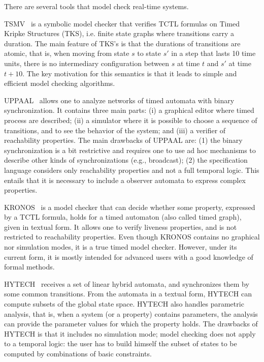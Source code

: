 \documentclass{llncs}
\begin{document}
There are several tools that model check real-time systems.

TSMV~\cite{Markey03} is a symbolic model checker that verifies TCTL formulas on Timed Kripke Structures (TKS), 
i.e. finite state graphs where transitions carry a duration. 
The main feature of TKS's is that the durations of transitions are atomic, that is, 
when moving from state $s$ to state $s{'}$ in a step that lasts 10 time units, 
there is no intermediary configuration between $s$ at time $t$ and $s{'}$ at time $t+10$. 
The key motivation for this semantics is that it leads to simple and efficient model checking algorithms.

UPPAAL~\cite{upaal97} allows one to analyze networks of timed automata with binary synchronization. 
It contains three main parts: (i) a graphical editor where timed process are described; 
(ii) a simulator where it is possible to choose a sequence of transitions, 
and to see the behavior of the system; and
(iii) a verifier of reachability properties. 
The main drawbacks of UPPAAL are: (1) the binary synchronization 
is a bit restrictive and requires one to use ad hoc mechanisms 
to describe other kinds of synchronizations (e.g., broadcast); 
(2) the specification language considers only reachability properties and not a full temporal logic.
This entails that it is necessary to include a observer automata to express complex properties. 

KRONOS~\cite{kronos97} is a model checker that can decide whether some property, 
expressed by a TCTL formula, holds for a timed automaton 
(also called timed graph), given in textual form. 
It allows one to verify liveness properties, 
and is not restricted to reachability properties. 
Even though KRONOS contains no graphical nor simulation modes,
it is a true timed model checker. 
However, under its current form, it is mostly intended for advanced users with a good knowledge of formal methods.

HYTECH~\cite{HyTech97} receives a set of linear hybrid automata, and synchronizes them by some common transitions. 
From the automata in a textual form, HYTECH can compute subsets of the global state space. 
HYTECH also handles parametric analysis, that is, when a system (or a property) contains parameters, 
the analysis can provide the parameter values for which the property holds. 
The drawbacks of HYTECH is that it includes no simulation mode; model checking does not apply to a temporal logic: 
the user has to build himself the subset of states to be computed by combinations of basic constraints. 
\end{document}
